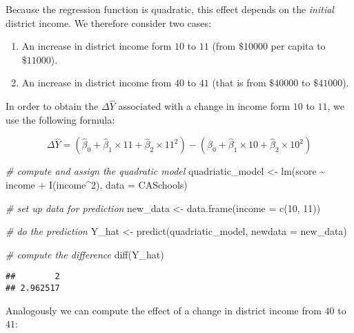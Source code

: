 \documentclass[
]{article}
\newenvironment{Shaded}{\begin{snugshade}}{\end{snugshade}}
\newcommand{\AttributeTok}[1]{\textcolor[rgb]{0.77,0.63,0.00}{#1}}
\newcommand{\CommentTok}[1]{\textcolor[rgb]{0.56,0.35,0.01}{\textit{#1}}}
\newcommand{\DecValTok}[1]{\textcolor[rgb]{0.00,0.00,0.81}{#1}}
\newcommand{\FunctionTok}[1]{\textcolor[rgb]{0.00,0.00,0.00}{#1}}
\newcommand{\NormalTok}[1]{#1}
\newcommand{\OtherTok}[1]{\textcolor[rgb]{0.56,0.35,0.01}{#1}}
\newcommand{\SpecialCharTok}[1]{\textcolor[rgb]{0.00,0.00,0.00}{#1}}
\begin{document}
Because the regression function is quadratic, this effect depends on the
\emph{initial} district income. We therefore consider two cases:

\begin{enumerate}
\def\labelenumi{\arabic{enumi}.}
\item
  An increase in district income form \(10\) to \(11\) (from \(\$10000\)
  per capita to \(\$11000\)).
\item
  An increase in district income from \(40\) to \(41\) (that is from
  \(\$40000\) to \(\$41000\)).
\end{enumerate}

In order to obtain the \(\Delta \widehat{Y}\) associated with a change
in income form \(10\) to \(11\), we use the following formula:

\[\Delta \widehat{Y} = \left(\hat{\beta}_0 + \hat{\beta}_1 \times 11 + \hat{\beta}_2 \times 11^2\right) - \left(\hat{\beta}_0 + \hat{\beta}_1 \times 10 + \hat{\beta}_2 \times 10^2\right) \]

\begin{Shaded}
\begin{Highlighting}[]
\CommentTok{\# compute and assign the quadratic model}
\NormalTok{quadriatic\_model }\OtherTok{\textless{}{-}} \FunctionTok{lm}\NormalTok{(score }\SpecialCharTok{\textasciitilde{}}\NormalTok{ income }\SpecialCharTok{+} \FunctionTok{I}\NormalTok{(income}\SpecialCharTok{\^{}}\DecValTok{2}\NormalTok{), }\AttributeTok{data =}\NormalTok{ CASchools)}

\CommentTok{\# set up data for prediction}
\NormalTok{new\_data }\OtherTok{\textless{}{-}} \FunctionTok{data.frame}\NormalTok{(}\AttributeTok{income =} \FunctionTok{c}\NormalTok{(}\DecValTok{10}\NormalTok{, }\DecValTok{11}\NormalTok{))}

\CommentTok{\# do the prediction}
\NormalTok{Y\_hat }\OtherTok{\textless{}{-}} \FunctionTok{predict}\NormalTok{(quadriatic\_model, }\AttributeTok{newdata =}\NormalTok{ new\_data)}

\CommentTok{\# compute the difference}
\FunctionTok{diff}\NormalTok{(Y\_hat)}
\end{Highlighting}
\end{Shaded}

\begin{verbatim}
##        2 
## 2.962517
\end{verbatim}

Analogously we can compute the effect of a change in district income
from \(40\) to \(41\):
\end{document}
